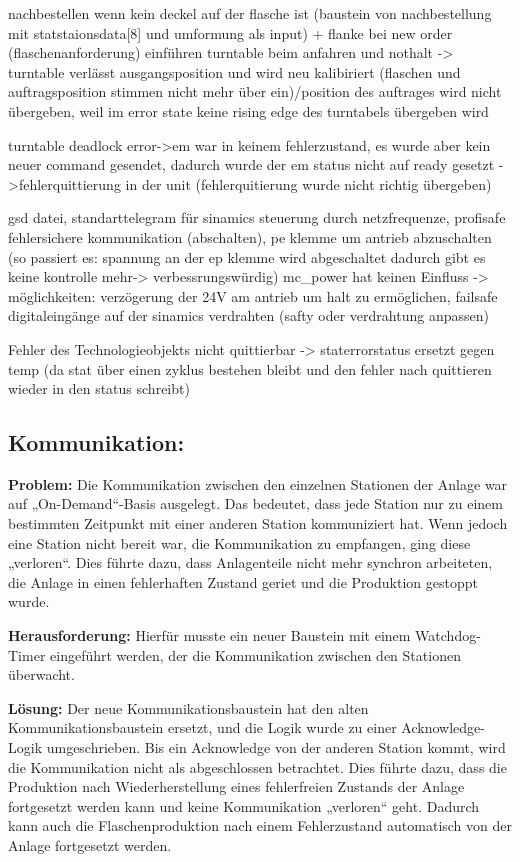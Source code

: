 nachbestellen wenn kein deckel auf der flasche ist (baustein von nachbestellung mit statstaionsdata[8] und umformung als input) + flanke bei new order (flaschenanforderung) einführen
turntable beim anfahren und nothalt -> turntable verlässt ausgangsposition und wird neu kalibiriert (flaschen und auftragsposition stimmen nicht mehr über ein)/position des auftrages wird nicht übergeben, weil im error state keine rising edge des turntabels übergeben wird

turntable deadlock error->em war in keinem fehlerzustand, es wurde aber kein neuer command gesendet, dadurch wurde der em status nicht auf ready gesetzt ->fehlerquittierung in der unit (fehlerquitierung wurde nicht richtig übergeben)

gsd datei, standarttelegram für sinamics steuerung durch netzfrequenze, profisafe fehlersichere kommunikation (abschalten), pe klemme um antrieb abzuschalten (so passiert es: spannung an der ep klemme wird abgeschaltet dadurch gibt es keine kontrolle mehr-> verbessrungswürdig) mc_power hat keinen Einfluss
-> möglichkeiten: verzögerung der 24V am antrieb um halt zu ermöglichen, failsafe digitaleingänge auf der sinamics verdrahten (safty oder verdrahtung anpassen)

Fehler des Technologieobjekts nicht quittierbar -> staterrorstatus ersetzt gegen temp (da stat über einen zyklus bestehen bleibt und den fehler nach quittieren wieder in den status schreibt)
\subsection{Kommunikation:} 

\textbf{Problem:}  
Die Kommunikation zwischen den einzelnen Stationen der Anlage war auf „On-Demand“-Basis ausgelegt. Das bedeutet, dass jede Station nur zu 
einem bestimmten Zeitpunkt mit einer anderen Station kommuniziert hat. Wenn jedoch eine Station nicht bereit war, die Kommunikation zu 
empfangen, ging diese „verloren“. Dies führte dazu, dass Anlagenteile nicht mehr synchron arbeiteten, die Anlage in einen fehlerhaften 
Zustand geriet und die Produktion gestoppt wurde.

\textbf{Herausforderung:}  
Hierfür musste ein neuer Baustein mit einem Watchdog-Timer eingeführt werden, der die Kommunikation zwischen den Stationen überwacht.

\textbf{Lösung:}  
Der neue Kommunikationsbaustein hat den alten Kommunikationsbaustein ersetzt, und die Logik wurde zu einer Acknowledge-Logik umgeschrieben. 
Bis ein Acknowledge von der anderen Station kommt, wird die Kommunikation nicht als abgeschlossen betrachtet. Dies führte dazu, dass die 
Produktion nach Wiederherstellung eines fehlerfreien Zustands der Anlage fortgesetzt werden kann und keine Kommunikation „verloren“ geht.
Dadurch kann auch die Flaschenproduktion nach einem Fehlerzustand automatisch von der Anlage fortgesetzt werden.


